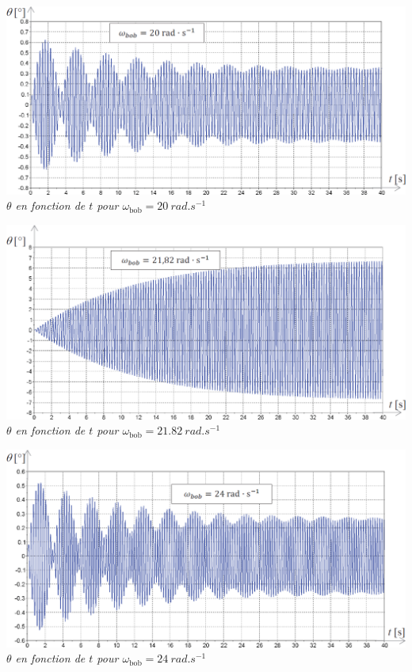 \documentclass[10pt,fleqn]{article} %
\begin{document}
\begin{multicols}{2}
\begin{minipage}[c]{.48\linewidth}
\begin{center}
\includegraphics[width=\linewidth]{images/ccp_07}
\textit{$\theta$ en fonction de $t$  pour $\omega_{\text{bob}}= \SI{20}{rad.s^{-1}}$}
\end{center}

\end{minipage} \hfill
\begin{minipage}[c]{.48\linewidth}
\begin{center}
\includegraphics[width=\linewidth]{images/ccp_08}
\textit{$\theta$ en fonction de $t$  pour $\omega_{\text{bob}}= \SI{21,82}{rad.s^{-1}}$}
\end{center}

\begin{center}
\includegraphics[width=\linewidth]{images/ccp_09}
\textit{$\theta$ en fonction de $t$  pour $\omega_{\text{bob}}= \SI{24}{rad.s^{-1}}$}
\end{center}


\end{minipage}
\end{multicols}
\end{document}
